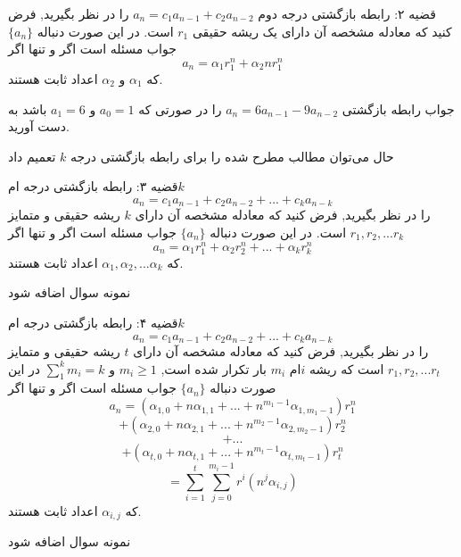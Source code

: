 \begin{theorem}
    قضیه ۲:
    رابطه‌ بازگشتی درجه دوم
    $a_n=c_1 a_{n-1}+c_2 a_{n-2}$
    را در نظر بگیرید, فرض کنید که معادله مشخصه آن دارای یک ریشه حقیقی 
    $r_1$
    است.
    در این صورت دنباله 
    $\{a_n\}$
    جواب مسئله است اگر و تنها اگر
    \[a_n=\alpha_1 r_1^n+\alpha_2 nr_1^n\]
    که
    $\alpha_1$
    و
    $\alpha_2$
    اعداد ثابت هستند.

\end{theorem}
\begin{problem}
    جواب رابطه‌ بازگشتی 
    $a_n=6a_{n-1}-9a_{n-2}$
    را در صورتی که
    $a_0=1$
    و
    $a_1=6$
    باشد به دست آورید.
\end{problem}
حال می‌توان مطالب مطرح شده را برای رابطه‌ بازگشتی درجه
$k$
تعمیم داد
\begin{theorem}
    قضیه ۳:
    رابطه‌ بازگشتی درجه 
    ام$k$
    \[a_n=c_{1}a_{n-1}+c_{2}a_{n-2}+...+c_{k}a_{n-k}\]
    را در نظر بگیرید, فرض کنید که معادله مشخصه آن دارای 
    $k$
    ریشه حقیقی و متمایز 
    $r_1, r_2, ...r_k $
    است.
    در این صورت دنباله 
    $\{a_n\}$
    جواب مسئله است اگر و تنها اگر
    \[a_n=\alpha_1 r_1^n+\alpha_2 r_2^n+...+\alpha_k r_k^n\]
    که
    $\alpha_1,\alpha_2,...\alpha_k$
    اعداد ثابت هستند.

\end{theorem}

\begin{problem}
    نمونه سوال اضافه شود
\end{problem}

\begin{theorem}
    قضیه ۴:
    رابطه‌ بازگشتی درجه 
    ام$k$
    \[a_n=c_{1}a_{n-1}+c_{2}a_{n-2}+...+c_{k}a_{n-k}\]
    را در نظر بگیرید, فرض کنید که معادله مشخصه آن دارای 
    $t$
    ریشه حقیقی و متمایز 
    $r_1, r_2, ...r_t $
    است که ریشه
    $i$ام 
    $m_i$
    بار تکرار شده است,  
    $m_i \geq 1$
    و
    $\sum_1^k m_i=k$
    در این صورت دنباله 
    $\{a_n\}$
    جواب مسئله است اگر و تنها اگر
    \[a_n=(\alpha_{1,0}+ n\alpha_{1,1}+...+n^{m_1-1}\alpha_{1,m_1-1})r_1^n\]
    \[+(\alpha_{2,0}+ n\alpha_{2,1}+...+n^{m_2-1}\alpha_{2,m_2-1})r_2^n\]
    \[+...\]
    \[+(\alpha_{t,0}+ n\alpha_{t,1}+...+n^{m_t-1}\alpha_{t,m_t-1})r_t^n\]
    \[=\sum_{i=1}^t\sum_{j=0}^{m_i-1}r^i(n^j\alpha_{i,j})\]
    که
    $\alpha_{i,j}$
    اعداد ثابت هستند.

\end{theorem}

\begin{problem}
    نمونه سوال اضافه شود
\end{problem}
